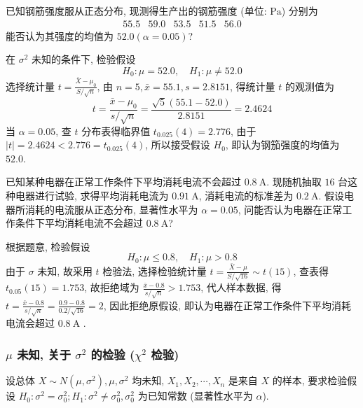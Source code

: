 \begin{example}
    已知钢筋强度服从正态分布, 现测得生产出的钢筋强度 (单位: $ \mathrm{Pa} $) 分别为
    $$\begin{array}{lllll}
            55.5 & 59.0 & 53.5 & 51.5 & 56.0
        \end{array}$$
    能否认为其强度的均值为 $ 52.0(\alpha=0.05) $?
\end{example}
\begin{solution}
    在 $ \sigma^{2} $ 未知的条件下, 检验假设
    $$H_{0}: \mu=52.0, \quad H_{1}: \mu \neq 52.0$$
    选择统计量 $\displaystyle t=\frac{\bar{X}-\mu_{0}}{S / \sqrt{n}}$, 
    由 $ n=5, \bar{x}=55.1, s=2.8151 $, 得统计量 $ t $ 的观测值为
    $$t=\frac{\bar{x}-\mu_{0}}{s / \sqrt{n}}=\frac{\sqrt{5}(55.1-52.0)}{2.8151}=2.4624$$
    当 $ \alpha=0.05 $, 查 $ t $ 分布表得临界值 $ t_{0.025}(4)=2.776 $, 由于 $ |t|=2.4624<2.776=t_{0.025}  (4)$, 所以接受假设 $ H_{0} $, 即认为钢笳强度的均值为 $ 52.0 $.
\end{solution}

\begin{example}
    已知某种电器在正常工作条件下平均消耗电流不会超过 $ 0.8 \mathrm{~A} $. 
    现随机抽取 $16$ 台这种电器进行试验, 求得平均消耗电流为 $ 0.91 \mathrm{~A} $, 消耗电流的标准差为 $ 0.2 \mathrm{~A}$. 
    假设电器所消耗的电流服从正态分布, 显著性水平为 $ \alpha=0.05$, 问能否认为电器在正常工作条件下平均消耗电流不会超过 $ 0.8 \mathrm{~A}$?
\end{example}
\begin{solution}
    根据题意, 检验假设
    $$H_{0}: \mu \leqslant 0.8, \quad H_{1}: \mu>0.8$$
    由于 $ \sigma $ 未知, 故采用 $ t $ 检验法, 选择检验统计量 $\displaystyle t=\frac{\bar{X}-\mu}{S / \sqrt{16}} \sim t(15) $, 
    查表得 $ t_{0.05}(15)=  1.753$, 故拒绝域为 $\displaystyle \frac{\bar{x}-0.8}{s / \sqrt{n}}>1.753 $, 代人样本数据, 得 $\displaystyle t=\frac{\bar{x}-0.8}{s / \sqrt{n}}=\frac{0.9-0.8}{0.2 / \sqrt{16}}=2 $, 因此拒绝原假设, 即认为电器在正常工作条件下平均消耗电流会超过  $0.8 \mathrm{~A}$ .
\end{solution}

\subsubsection{\texorpdfstring{$\mu$}. 未知, 关于 \texorpdfstring{$\sigma^2$}. 的检验 (\texorpdfstring{$\chi^2$}. 检验)}

设总体 $ X \sim N\left(\mu, \sigma^{2}\right), \mu, \sigma^{2} $ 均未知, $X_{1}, X_{2}, \cdots, X_{n} $ 是来自 $ X $ 的样本, 要求检验假设 $ H_{0}: \sigma^{2}=\sigma_{0}^{2} ; H_{1}: \sigma^{2} \neq \sigma_{0}^{2}, \sigma_{0}^{2} $ 为已知常数 (显著性水平为 $ \alpha $).

